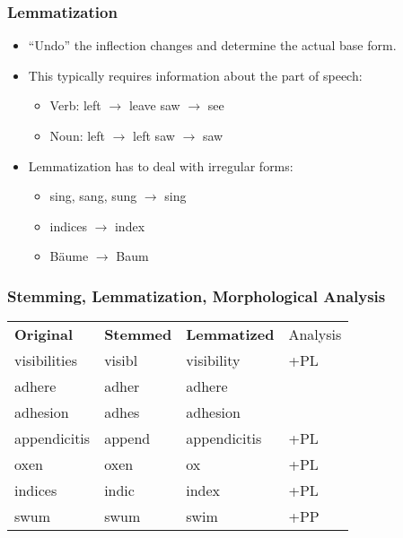             \subsubsection{Lemmatization} %
                \begin{itemize}
                	\item \enquote{Undo} the inflection changes and determine the actual base form.
                	\item This typically requires information about the part of speech:
                		\begin{itemize}
                			\item Verb: \tabto{1.5cm} left \(\rightarrow\) leave \tabto{5cm} saw \(\rightarrow\) see
                			\item Noun: \tabto{1.5cm} left \(\rightarrow\) left  \tabto{5cm} saw \(\rightarrow\) saw
                		\end{itemize}
                	\item Lemmatization has to deal with irregular forms:
                		\begin{itemize}
                			\item sing, sang, sung \(\rightarrow\) sing
                			\item indices \(\rightarrow\) index
                			\item Bäume \(\rightarrow\) Baum
                		\end{itemize}
                \end{itemize}

            \subsubsection{Stemming, Lemmatization, Morphological Analysis} %
                \begin{table}[H]
                	\centering
                	\begin{tabular}{l l l l}
                		\textbf{Original} & \textbf{Stemmed} & \textbf{Lemmatized} & Analysis \\
                		visibilities      & visibl           & visibility          & +PL      \\
                		adhere            & adher            & adhere              &          \\
                		adhesion          & adhes            & adhesion            &          \\
                		appendicitis      & append           & appendicitis        & +PL      \\
                		oxen              & oxen             & ox                  & +PL      \\
                		indices           & indic            & index               & +PL      \\
                		swum              & swum             & swim                & +PP
                	\end{tabular}
                \end{table}

